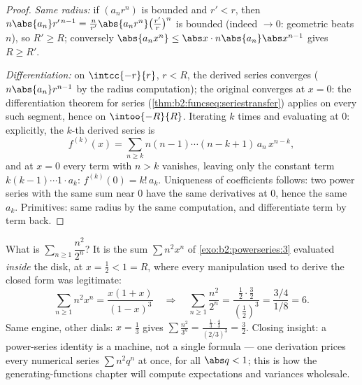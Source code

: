\begin{proof}
\emph{Same radius:} if $(a_nr^n)$ is bounded and $r' < r$, then
$n\abs{a_n} r'^{\,n-1} = \frac{n}{r'}\abs{a_nr^n}
\bigl(\frac{r'}{r}\bigr)^n$ is bounded (indeed $\to 0$: geometric
beats $n$), so $R' \geq R$; conversely $\abs{a_n x^n} \leq \abs x
\cdot n\abs{a_n}\abs x^{n-1}$ gives $R \geq R'$.

\emph{Differentiation:} on $\intcc{-r}{r}$, $r < R$, the derived
series converges  ($n\abs{a_n}r^{n-1}$  by the
radius computation); the original converges at $x = 0$: the
differentiation theorem for series
(\cref{thm:b2:funcseq:seriestransfer}) applies on every such
segment, hence on $\intoo{-R}{R}$. Iterating $k$ times and
evaluating at $0$: explicitly, the $k$-th derived series is
\[
f^{(k)}(x) = \sum_{n\geq k} n(n-1)\cdots(n-k+1)\,a_n\,x^{n-k},
\]
and at $x = 0$ every term with $n > k$ vanishes, leaving only
the constant term $k(k-1)\cdots1\cdot a_k$: $f^{(k)}(0) =
k!\,a_k$. Uniqueness of coefficients follows: two power series
with the same sum near $0$ have the same derivatives at $0$,
hence the same $a_k$. Primitives: same radius by the same
computation, and differentiate term by term back.
\end{proof}

\begin{example}\label{ex:b2:powerseries:evaluate}
What is $\sum_{n\geq1}\dfrac{n^2}{2^n}$? It is the sum
$\sum n^2x^n$ of \cref{exo:b2:powerseries:3} evaluated
\emph{inside} the disk, at $x = \frac12 < 1 = R$, where every
manipulation used to derive the closed form was legitimate:
\[
\sum_{n\geq1} n^2x^n = \frac{x(1+x)}{(1-x)^3}
\quad\Longrightarrow\quad
\sum_{n\geq1}\frac{n^2}{2^n}
= \frac{\frac12\cdot\frac32}{(\frac12)^3}
= \frac{3/4}{1/8} = 6 .
\]
Same engine, other dials: $x = \frac13$ gives
$\sum\frac{n^2}{3^n} = \frac{\frac13\cdot\frac43}{(2/3)^3} =
\frac32$. Closing insight: a power-series identity is a
machine, not a single formula --- one derivation prices every
numerical series $\sum n^2q^n$ at once, for all $\abs q < 1$;
this is how the generating-functions chapter will compute
expectations and variances wholesale.
\end{example}

